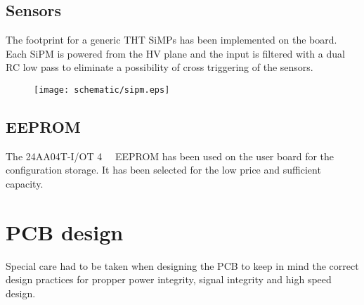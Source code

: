 \section{Sensors}
The footprint for a generic THT SiMPs has been implemented on the board. Each SiPM is powered from the HV plane and the input is filtered with a dual RC low pass to eliminate a possibility of cross triggering of the sensors. 

\FloatBarrier
\begin{figure}[htp!]
    \centering
    \texttt{[image: schematic/sipm.eps]}
    \label{fig:sipm}
\end{figure}
\FloatBarrier

\section{EEPROM}
The 24AA04T-I/OT \SI{4}{\kilo\bit} EEPROM has been used on the user board for the configuration storage. It has been selected for the low price and sufficient capacity. 



\newpage
\chapter{PCB design}
Special care had to be taken when designing the PCB to keep in mind the correct design practices for propper power integrity, signal integrity and high speed design.

